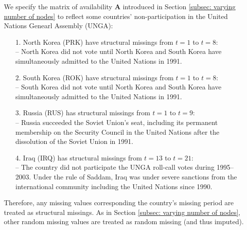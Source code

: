 \documentclass[a4paper]{article}
\begin{document}
We specify the matrix of availability $\mathbf{A}$ introduced in Section \ref{subsec: varying number of nodes} to reflect some countries' non-participation in the United Nations Genearl Assembly (UNGA): 
\begin{itemize}
	\item[1.]  North Korea (PRK) have structural missings from $t = 1$ to $t = 8$:\\
	-- North Korea did not vote until North Korea and South Korea have simultaneously admitted to the United Nations in 1991.
	\item[2.] South Korea (ROK) have structural missings from $t = 1$ to $t = 8$:\\
	-- South Korea did not vote until North Korea and South Korea have simultaneously admitted to the United Nations in 1991.
	\item [3.] Russia (RUS) has structural missings from $t=1$ to $t =9$:\\
-- Russia succeeded the Soviet Union's seat, including its permanent membership on the Security Council in the United Nations after the dissolution of the Soviet Union in 1991. 
	\item [4.] Iraq (IRQ) has structural missings from $t =13$ to $t = 21$:\\
	-- The country did not participate the UNGA roll-call votes during 1995--2003. Under the rule of Saddam, Iraq was under severe sanctions from the international community including the United Nations since 1990.
\end{itemize}
Therefore, any missing values corresponding the country's missing period are treated as structural missings. As in Section \ref{subsec: varying number of nodes}, other random missing values are treated as random missing (and thus imputed). 
\end{document}
